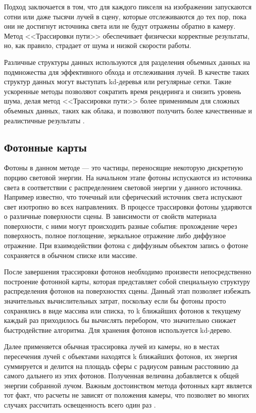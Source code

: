 Подход заключается в том, что для каждого пикселя на изображении запускаются сотни или даже тысячи лучей в сцену, которые отслеживаются до тех пор, пока они не достигнут источника света или не будут отражены обратно в камеру. Метод <<Трассировки пути>> обеспечивает физически корректные результаты, но, как правило, страдает от шума и низкой скорости работы.

Различные структуры данных используются для разделения объемных данных на подмножества для эффективного обхода и отслеживания лучей. В качестве таких структур данных могут выступать kd-деревья или регулярные сетки. Такие ускоренные методы позволяют сократить время рендеринга и снизить уровень шума, делая метод <<Трассировки пути>> более применимым для сложных объемных данных, таких как облака, и позволяют получить более качественные и реалистичные результаты \cite{clouds}.

\subsection{Фотонные карты}

Фотоны в данном методе — это частицы, переносящие некоторую дискретную порцию световой энергии. На начальном этапе фотоны испускаются из источника света в соответствии с распределением световой энергии у данного источника. Например известно, что точечный или сферический источник света испускают свет изотропно во всех направлениях. В  процессе  трассировки  фотоны  ударяются  о  различные  поверхности  сцены.  В 
зависимости от свойств материала поверхности, с ними могут происходить разные события: 
прохождение через поверхность, полное поглощение, зеркальное отражение либо диффузное отражение. При  взаимодействии  фотона  с  диффузным  объектом  запись  о  фотоне 
сохраняется в обычном списке или массиве. 

После  завершения  трассировки  фотонов  необходимо  произвести  непосредственно 
построение  фотонной  карты,  которая  представляет  собой  специальную  структуру 
распределения  фотонов  на  поверхностях  сцены.  Данный  этап  позволяет  избежать 
значительных вычислительных затрат, поскольку если бы фотоны просто сохранялись в виде 
массива  или  списка,  то  k  ближайших  фотонов  к  текущему  каждый  раз  приходилось  бы 
вычислять перебором, что значительно снижает быстродействие алгоритма. Для хранения фотонов используется kd-дерево.

Далее применяется обычная трассировка лучей из камеры, но в местах пересечения лучей с объектами находятся k ближайших фотонов, их энергия суммируется и делится на площадь сферы с радиусом равным расстоянию да самого дальнего из этих фотонов. Полученная величина добавляется к общей энергии собранной лучом. Важным  достоинством  метода  фотонных  карт  является  тот  факт,  что  расчеты  не 
зависят  от  положения  камеры,  что  позволяет во  многих  случаях  рассчитать  освещенность 
всего  один  раз \cite{photon}.

